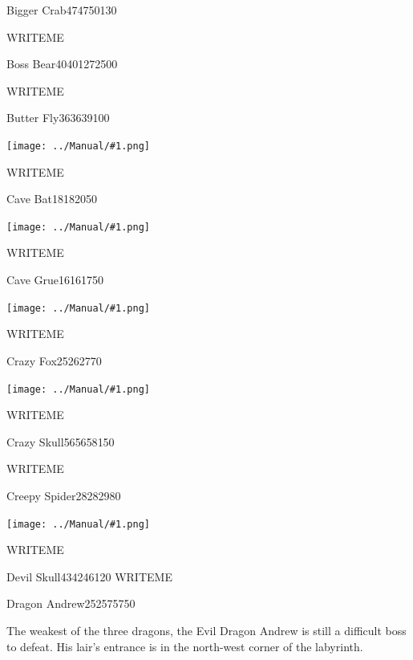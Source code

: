 \documentclass[10pt,twocolumn]{memoir}
\newcommand\pic[1]{%
  \begin{center}
    \texttt{[image: ../Manual/\#1.png]}
  \end{center}}
\begin{document}
\begin{monsterpage}{Bigger Crab}{47}{47}{50}{130}

  
  WRITEME
\end{monsterpage}

\begin{bosspage}{Boss Bear}{40}{40}{127}{2500}

  
  WRITEME
\end{bosspage}

\begin{monsterpage}{Butter Fly}{36}{36}{39}{100}

  \pic{Butterfly}
  
  WRITEME
\end{monsterpage}

\begin{monsterpage}{Cave Bat}{18}{18}{20}{50}

  \pic{Cave-Bat}
  
  WRITEME
\end{monsterpage}

\begin{bosspage}{Cave Grue}{16}{16}{17}{50}
  \pic{Cave-Grue}
  
  WRITEME
\end{bosspage}

\begin{monsterpage}{Crazy Fox}{25}{26}{27}{70}
  \pic{Crazy-Fox}
  
  WRITEME
\end{monsterpage}

\begin{monsterpage}{Crazy Skull}{56}{56}{58}{150}
  
  WRITEME
\end{monsterpage}

\begin{monsterpage}{Creepy Spider}{28}{28}{29}{80}
  \pic{Creepy-Spider}
  
  WRITEME
\end{monsterpage}

\begin{monsterpage}{Devil Skull}{43}{42}{46}{120}
  WRITEME
\end{monsterpage}

\begin{bosspage}{Dragon Andrew}{25}{25}{75}{750}

  The weakest  of the  three dragons,  the Evil  Dragon Andrew  is still
  a difficult boss  to defeat. His lair's entrance is  in the north-west
  corner of the labyrinth.
  
\end{bosspage}
\end{document}
